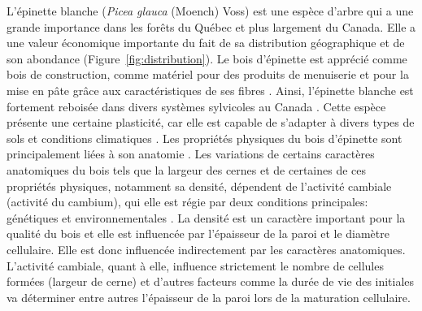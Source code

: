 \documentclass{report}
\begin{document}
L'épinette blanche (\textit{Picea glauca} (Moench) Voss) est une espèce d'arbre qui a une grande importance dans les forêts du Québec et plus largement du Canada. Elle a une valeur économique importante du fait de sa distribution géographique et de son abondance (Figure~\ref{fig:distribution}). Le bois d'épinette est apprécié comme bois de construction, comme matériel pour des produits de menuiserie et pour la mise en pâte grâce aux caractéristiques de ses fibres \citep{Zhang2008}. Ainsi, l'épinette blanche est fortement reboisée dans  divers systèmes sylvicoles au Canada \citep{Canadian2009}. Cette espèce présente une certaine plasticité, car elle est capable de s'adapter à divers types de sols et conditions climatiques \citep{Nienstaedt1990}. Les propriétés physiques du bois d'épinette sont principalement liées à son anatomie \citep{Rossi2012}. Les variations de certains caractères anatomiques du bois tels que la largeur des cernes et de certaines de ces propriétés physiques, notamment sa densité, dépendent de l'activité cambiale (activité du cambium), qui elle est régie par deux conditions principales: génétiques et environnementales \citep{Dufour2010,Rossi2012}. La densité est un caractère important pour la qualité du bois et elle est influencée par l'épaisseur de la paroi et le diamètre cellulaire. Elle est donc influencée indirectement par les caractères anatomiques. L'activité cambiale, quant à elle, influence strictement le nombre de cellules formées (largeur de cerne) et d'autres facteurs comme la durée de vie des initiales va déterminer entre autres l'épaisseur de la paroi lors de la maturation cellulaire.\\
\end{document}
